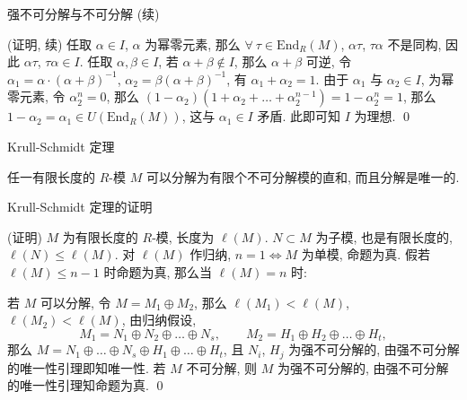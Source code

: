 \begin{frame}{强不可分解与不可分解 (续)}

\startproof[bg=yellow, fg=red](证明, 续)
任取 $\alpha \in I$, $\alpha$ 为幂零元素, 那么 $\forall\ \tau \in \mathrm{End}_R(M)$,
$\alpha \tau$, $\tau \alpha$ 不是同构, 因此 $\alpha \tau$, $\tau \alpha \in I$.
任取 $\alpha, \beta \in I$, 若 $\alpha + \beta \notin I$, 那么 $\alpha + \beta$ 可逆,
令 $\alpha_1 = \alpha \cdot (\alpha + \beta)^{-1}$,
$\alpha_2 = \beta (\alpha + \beta)^{-1}$, 有 $\alpha_1 + \alpha_2 = 1$.
由于 $\alpha_1$ 与 $\alpha_2 \in I$, 为幂零元素, 令 $\alpha_2^n = 0$,
那么 $(1 - \alpha_2)(1 + \alpha_2 + \dots + \alpha_2^{n-1}) = 1 - \alpha_2^n = 1$,
那么 $1 - \alpha_2 = \alpha_1 \in U(\mathrm{End}_R(M))$, 这与 $\alpha_1 \in I$ 矛盾.
此即可知 $I$ 为理想.
\qed

\end{frame}


\begin{frame}{Krull-Schmidt 定理}


\begin{thm}
任一有限长度的 $R$-模 $M$ 可以分解为有限个不可分解模的直和, 而且分解是唯一的.
\end{thm}

\end{frame}


\begin{frame}{Krull-Schmidt 定理的证明}

\startproof[bg=yellow, fg=red](证明)
$M$ 为有限长度的 $R$-模, 长度为 $\ell(M)$.
$N \subset M$ 为子模, 也是有限长度的, $\ell(N) \leq \ell(M)$.
对 $\ell(M)$ 作归纳, $n = 1 \iff M$ 为单模, 命题为真.
假若 $\ell(M) \leq n - 1$ 时命题为真, 那么当 $\ell(M) = n$ 时:

\pause

若 $M$ 可以分解, 令 $M = M_1 \oplus M_2$,
那么 $\ell(M_1) < \ell(M)$, $\ell(M_2) < \ell(M)$,
由归纳假设,
\[
M_1 = N_1 \oplus N_2 \oplus \dots \oplus N_s, \qquad
M_2 = H_1 \oplus H_2 \oplus \dots \oplus H_t,
\]
那么 $M = N_1 \oplus \dots \oplus N_s \oplus H_1 \oplus \dots \oplus H_t$,
且 $N_i$, $H_j$ 为强不可分解的,
由强不可分解的唯一性引理即知唯一性.
若 $M$ 不可分解, 则 $M$ 为强不可分解的,
由强不可分解的唯一性引理知命题为真.
\qed

\end{frame}




